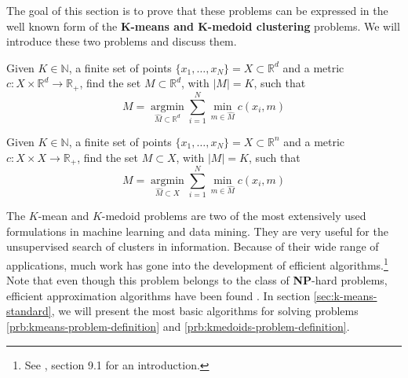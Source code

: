 The goal of this section is to prove that these problems can be expressed in the well known form of the \textbf{$\mathbf{K}$-means and $\mathbf{K}$-medoid clustering} problems.
We will introduce these two problems and discuss them.
\begin{problem}
  \label{prb:kmeans-problem-definition}
  Given $K\in \mathbb{N}$, a finite set of points $\{x_1,\ldots , x_N\} = X\subset\mathbb{R}^d$ and a metric $c:X\times \mathbb{R}^d\rightarrow\mathbb{R}_+$, find the set $M\subset\mathbb{R}^d$, with $|M|=K$, such that
  \begin{equation}
    \label{eq:kmeans-problem-definition}
    M = \underset{\hat{M}\subset\mathbb{R}^{d}}{\operatorname{argmin}} \sum_{i=1}^N\min\limits_{m\in \hat{M}}c(x_i, m)
  \end{equation}
\end{problem}
\begin{problem}
  \label{prb:kmedoids-problem-definition}
  Given $K\in \mathbb{N}$, a finite set of points $\{x_1,\ldots , x_N\} = X\subset\mathbb{R}^n$ and a metric $c:X\times X\rightarrow\mathbb{R}_+$, find the set $M\subset X$, with $|M|=K$, such that
  \begin{equation}
    \label{eq:kmedoids-problem-definition}
    M = \underset{\hat{M}\subset X}{\operatorname{argmin}} \sum_{i=1}^N\min\limits_{m\in \hat{M}}c(x_i, m)
  \end{equation}
\end{problem}
The $K$-mean and $K$-medoid problems are two of the most extensively used formulations in machine learning and data mining.
They are very useful for the unsupervised search of clusters in information.
Because of their wide range of applications, much work has gone into the development of efficient algorithms.\footnote{See , section 9.1 for an introduction.}
Note that even though this problem belongs to the class of \textbf{NP}-hard problems, efficient approximation algorithms have been found \cite{Vazirani2003}.
In section \ref{sec:k-means-standard}, we will present the most basic algorithms for solving problems \ref{prb:kmeans-problem-definition} and \ref{prb:kmedoids-problem-definition}.
